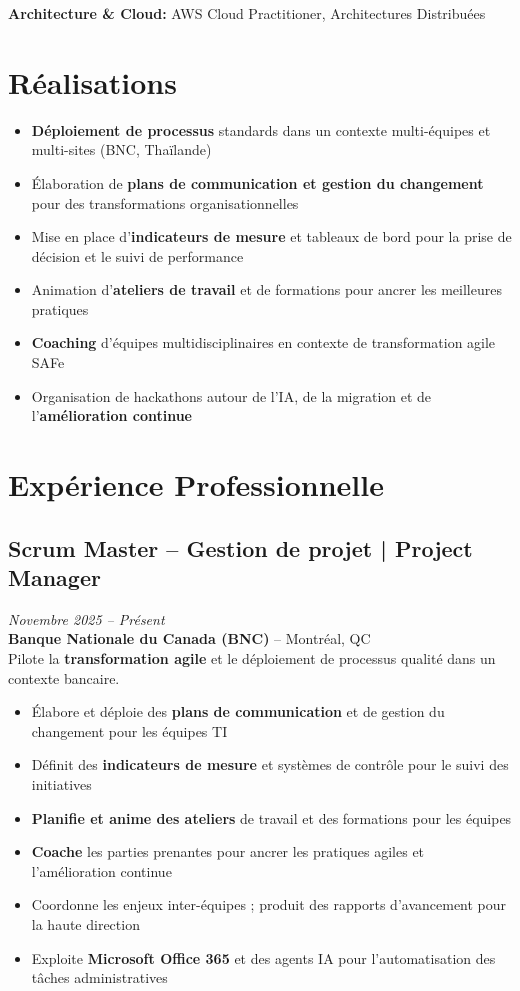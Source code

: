 \documentclass[11pt,a4paper]{article}
\begin{document}
\textbf{Architecture \& Cloud:} AWS Cloud Practitioner, Architectures Distribuées

\vspace{6pt}

\section*{Réalisations}
\begin{itemize}
    \item \textbf{Déploiement de processus} standards dans un contexte multi-équipes et multi-sites (BNC, Thaïlande)
    \item Élaboration de \textbf{plans de communication et gestion du changement} pour des transformations organisationnelles
    \item Mise en place d'\textbf{indicateurs de mesure} et tableaux de bord pour la prise de décision et le suivi de performance
    \item Animation d'\textbf{ateliers de travail} et de formations pour ancrer les meilleures pratiques
    \item \textbf{Coaching} d'équipes multidisciplinaires en contexte de transformation agile SAFe
    \item Organisation de hackathons autour de l'IA, de la migration et de l'\textbf{amélioration continue}
\end{itemize}

\section*{Expérience Professionnelle}

\subsection*{Scrum Master -- Gestion de projet | Project Manager} \hfill \textit{Novembre 2025 -- Présent}\\
\textbf{Banque Nationale du Canada (BNC)} -- Montréal, QC\\
Pilote la \textbf{transformation agile} et le déploiement de processus qualité dans un contexte bancaire.
\begin{itemize}
    \item Élabore et déploie des \textbf{plans de communication} et de gestion du changement pour les équipes TI
    \item Définit des \textbf{indicateurs de mesure} et systèmes de contrôle pour le suivi des initiatives
    \item \textbf{Planifie et anime des ateliers} de travail et des formations pour les équipes
    \item \textbf{Coache} les parties prenantes pour ancrer les pratiques agiles et l'amélioration continue
    \item Coordonne les enjeux inter-équipes ; produit des rapports d'avancement pour la haute direction
    \item Exploite \textbf{Microsoft Office 365} et des agents IA pour l'automatisation des tâches administratives
\end{itemize}
\end{document}
